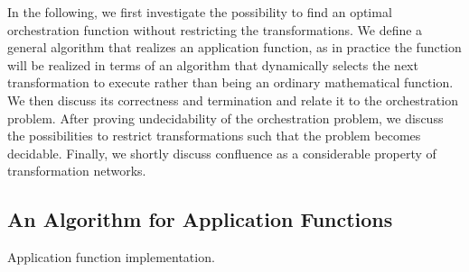 In the following, we first investigate the possibility to find an optimal orchestration function without restricting the transformations.
We define a general algorithm that realizes an application function, as in practice the function will be realized in terms of an algorithm that dynamically selects the next transformation to execute rather than being an ordinary mathematical function.
We then discuss its correctness and termination and relate it to the orchestration problem.
After proving undecidability of the orchestration problem, we discuss the possibilities to restrict transformations such that the problem becomes decidable.
Finally, we shortly discuss confluence as a considerable property of transformation networks.



\subsection{An Algorithm for Application Functions}
\label{chap:orchestration:decidability:algorithm}


\newcommand{\applyalgexecuted}{\sequence{\transformation{t}_{\mathvariable{executed}}}}
\newcommand{\applyalggenerated}{\sequence{\changetuple{\metamodeltuple{M}, \mathvariable{generated}}}}
\begin{algorithm}
    
    \caption[Application function implementation]{Application function implementation.}
    \label{algo:orchestration:application}
\end{algorithm}

